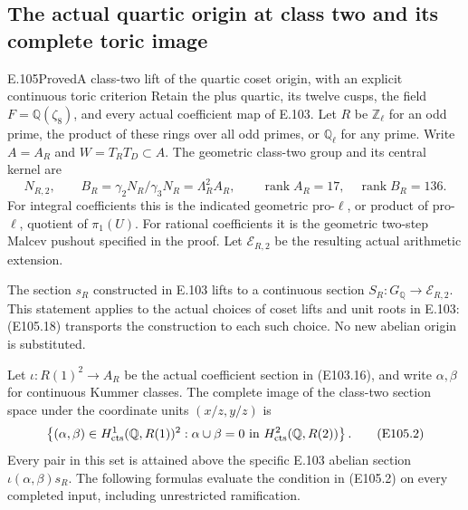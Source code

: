 \subsection*{The actual quartic origin at class two and its complete toric image}
\begin{statement}{E.105}{Proved}{A class-two lift of the quartic coset origin, with an explicit continuous toric criterion}
Retain the plus quartic, its twelve cusps, the field
$F=\mathbb Q(\zeta _8)$, and every actual coefficient map of E.103.
Let $R$ be $\mathbb Z_\ell$ for an odd prime, the product of these
rings over all odd primes, or $\mathbb Q_\ell$ for any prime.
Write $A=A_R$ and $W=T_RT_D\subset A$.
The geometric class-two group and its central kernel are
\[
 N_{R,2},\qquad B_R=\gamma _2N_R/\gamma _3N_R
       =\Lambda ^2_R A_R,\qquad
 \operatorname{rank}A_R=17,\quad\operatorname{rank}B_R=136.
 \tag{E105.1}
\]
For integral coefficients this is the indicated geometric
pro-$\ell$, or product of pro-$\ell$, quotient of $\pi _1(U)$.
For rational coefficients it is the geometric two-step Malcev
pushout specified in the proof.  Let $\mathcal E_{R,2}$ be the
resulting actual arithmetic extension.

The section $s_R$ constructed in E.103 lifts to a continuous
section $S_R:G_{\mathbb Q}\to\mathcal E_{R,2}$.
This statement applies to the actual choices of coset lifts and
unit roots in E.103: (E105.18) transports the construction to
each such choice.  No new abelian origin is substituted.

Let $\iota:R(1)^2\to A_R$ be the actual coefficient section in
(E103.16), and write $\alpha,\beta$ for continuous Kummer classes.
The complete image of the class-two section space under the
coordinate units $(x/z,y/z)$ is
\[
 \left\{(\alpha,\beta)\in H^1_{\rm cts}(\mathbb Q,R(1))^2:
             \alpha\cup\beta=0
                  \text{ in }H^2_{\rm cts}(\mathbb Q,R(2))\right\}.
 \tag{E105.2}
\]
Every pair in this set is attained above the specific E.103
abelian section $\iota(\alpha,\beta)s_R$.
The following formulas evaluate the condition in (E105.2) on
every completed input, including unrestricted ramification.


\end{statement}
